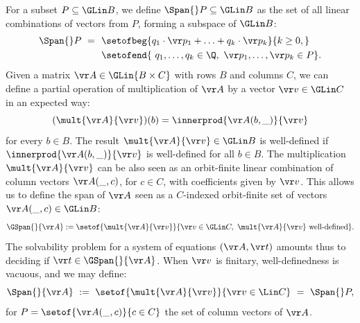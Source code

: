 For a subset $P\subseteq \GLin B$, we define $\Span {} P\subseteq \GLin B$ as the set of 
all linear combinations of vectors from $P$, forming a subspace of $\GLin B$:
\begin{align*} %
\begin{aligned}
\Span {} P \ = \ \ & \setofbeg{q_1 \cdot \vr p_1 + \ldots + q_k \cdot \vr p_k}{k\geq 0,}\\
& \setofend{\ q_1,\ldots,q_k\in\Q, \ \vr p_1, \ldots, \vr p_k\in P}.
\end{aligned}
\end{align*}
%
Given a matrix $\vr A \in \GLin {B\times C}$ with rows $B$ and columns $C$, we can define a partial operation of 
multiplication of $\vr A$ by a vector $\vr v\in\GLin C$ in an expected way:
\[
(\mult {\vr A}{\vr v})(b) = \innerprod {\vr A(b, \_)} {\vr v}
\]
for every $b\in B$.
The result $\mult {\vr A} {\vr v} \in \GLin B$ is well-defined if $\innerprod {\vr A(b, \_)}{\vr v}$ is well-defined for all $b\in B$.
The multiplication $\mult {\vr A}{\vr v}$ can be also seen as an orbit-finite linear combination of 
column vectors $\vr A(\_, c)$, for $c\in C$, with coefficients given by $\vr v$. 
This allows us to define the span of $\vr A$ seen as a $C$-indexed orbit-finite set of 
vectors $\vr A(\_, c) \in \GLin B$:
\begin{align} \label{eq:Gspan}
\GSpan {} {\vr A}  :=  \setof{\mult{\vr A}{\vr v}}{\vr v \in \GLin C, \ \mult{\vr A}{\vr v} \text{ well-defined}}.
\end{align}
The solvability problem for a system of equations $(\vr A, \vr t)$ amounts thus to deciding
if $\vr t \in \GSpan {} {\vr A}$.
When $\vr v$ is finitary, well-definedness is vacuous, and we may define:
\[
\Span {} {\vr A} \ := \ \setof{\mult{\vr A}{\vr v}}{\vr v \in \Lin C} \ = \ \Span {} P,
\]
for $P = \setof{\vr A(\_, c)}{c\in C}$ the set of column vectors of $\vr A$.

